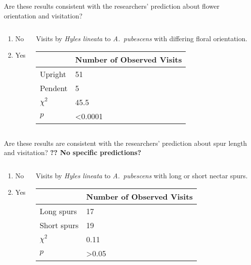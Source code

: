 \documentclass[t]{beamer}
\newcommand{\ques}[1]{\highlight{\textsc{q#1:}}}
\begin{document}
\begin{frame}[t]{\ques{11} Are these results consistent with the researchers’ prediction about flower orientation and visitation?}
	
	\begin{columns}[t]
		\begin{column}{0.28\textwidth}
			\begin{enumerate}
				\item No
				\item Yes
			\end{enumerate}
		\end{column}
		\begin{column}{0.5\textwidth}
	Visits by \textit{Hyles lineata} to \textit{A.~pubescens} with differing floral orientation.
	
	\begin{tabular}{L{0.6in}R{1in}}
		\toprule
		& Number of Observed Visits \tabularnewline
		\midrule
		Upright		&	51	 \tabularnewline
		Pendent		&	5	 \tabularnewline
		$\chi^2$	&	45.5 \tabularnewline
		$p$			&  \textless0.0001 \tabularnewline
		\bottomrule
	\end{tabular}
\end{column}
	\end{columns}
\end{frame}
%
\begin{frame}[t]{\ques{12} Are these results are consistent with the researchers’ prediction about spur length and visitation? \textbf{?? No specific predictions?}}
	
	\begin{columns}[t]
		\begin{column}{0.28\textwidth}
			\begin{enumerate}
				\item No
				\item Yes
			\end{enumerate}
		\end{column}
		\begin{column}{0.5\textwidth}
			Visits by \textit{Hyles lineata} to \textit{A.~pubescens} with long or short nectar spurs.
			
			\begin{tabular}{L{0.6in}R{1in}}
				\toprule
				& Number of Observed Visits \tabularnewline
				\midrule
				Long spurs		&	17	 \tabularnewline
				Short spurs		&	19	 \tabularnewline
				$\chi^2$		&	0.11 \tabularnewline
				$p$				&  \textgreater0.05 \tabularnewline
				\bottomrule
			\end{tabular}
		\end{column}
	\end{columns}
\end{frame}
\end{document}
